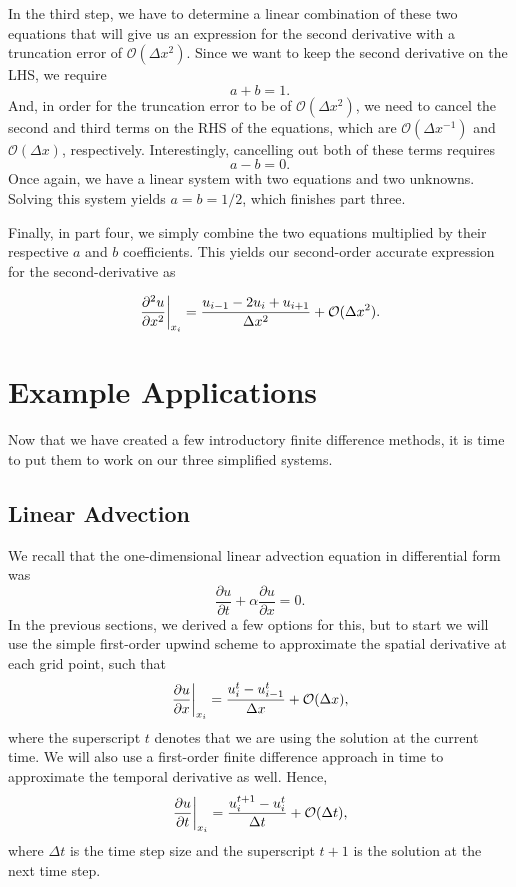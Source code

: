 In the third step, we have to determine a linear combination of these two equations that will give us an expression for the second derivative with a truncation error of $\mathcal{O}(\Delta x^2)$. Since we want to keep the second derivative on the LHS, we require
\begin{equation}
	a + b = 1.
\end{equation}
And, in order for the truncation error to be of $\mathcal{O}(\Delta x^2)$, we need to cancel the second and third terms on the RHS of the equations, which are $\mathcal{O}(\Delta x^{-1})$ and $\mathcal{O}(\Delta x)$, respectively. Interestingly, cancelling out both of these terms requires
\begin{equation}
	a - b = 0.
\end{equation}
Once again, we have a linear system with two equations and two unknowns. Solving this system yields $a=b=1/2$, which finishes part three.

Finally, in part four, we simply combine the two equations multiplied by their respective $a$ and $b$ coefficients. This yields our second-order accurate expression for the second-derivative as
\begin{eqBox}
\begin{equation}
	\left.\frac{\partial^2 u}{\partial x^2}\right\rvert_{x_i}^{} = \frac{u_{i-1} - 2u_i + u_{i+1}}{\Delta x^2} + \mathcal{O}(\Delta x^2).
\end{equation}
\end{eqBox}

\section{Example Applications}
Now that we have created a few introductory finite difference methods, it is time to put them to work on our three simplified systems.
\subsection{Linear Advection}
We recall that the one-dimensional linear advection equation in differential form was
\begin{equation}
	\frac{\partial u}{\partial t} +  \alpha \frac{\partial u}{\partial x} = 0.
\end{equation}
In the previous sections, we derived a few options for this, but to start we will use the simple first-order upwind scheme to approximate the spatial derivative at each grid point, such that
\begin{equation}
	\left.\frac{\partial u}{\partial x}\right\rvert_{x_i}^{} = \frac{u_i^t - u_{i-1}^t}{\Delta x} + \mathcal{O}(\Delta x),
\end{equation}
where the superscript $t$ denotes that we are using the solution at the current time. We will also use a first-order finite difference approach in time to approximate the temporal derivative as well. Hence,
\begin{equation}
	\left.\frac{\partial u}{\partial t}\right\rvert_{x_i}^{} = \frac{u_i^{t+1} - u_{i}^t}{\Delta t} + \mathcal{O}(\Delta t),
\end{equation}
where $\Delta t$ is the time step size and the superscript $t+1$ is the solution at the next time step.

